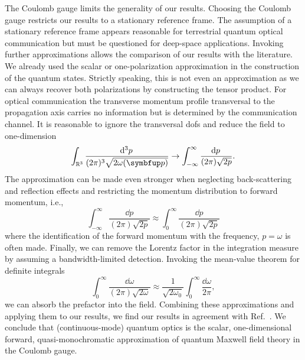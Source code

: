 The Coulomb gauge limits the generality of our results.
Choosing the Coulomb gauge restricts our results to a stationary reference frame.
The assumption of a stationary reference frame appears reasonable for terrestrial quantum optical communication but must be questioned for deep-space applications.
Invoking further approximations allows the comparison of our results with the literature.
We already used the scalar or one-polarization approximation in the construction of the quantum states.
Strictly speaking, this is not even an approximation as we can always recover both polarizations by constructing the tensor product.
For optical communication the transverse momentum profile transversal to the propagation axis carries no information but is determined by the communication channel.
It is reasonable to ignore the transversal \gls{dof}s and reduce the field to one-dimension~ \cite[p.~53]{Cohen2019}
\begin{equation}
	\int_{\mathbb{R}^3}
	\frac{\dd[3]{p}}{(2\pi)^3\sqrt{2\omega(\vb{p})}}
	\to
	\int_{-\infty}^{\infty}
	\frac{\dd{p}}{(2\pi)\sqrt{2p}}
	.
\end{equation}
The approximation can be made even stronger when neglecting back-scattering and reflection effects and restricting the momentum distribution to forward momentum, i.e.,
\begin{equation}
	\int_{-\infty}^{\infty}
	\frac{\dd{p}}{(2\pi)\sqrt{2p}}
	\approx	
	\int_{0}^{\infty}
	\frac{\dd{p}}{(2\pi)\sqrt{2p}}	
\end{equation}
where the identification of the forward momentum with the frequency, $p=\omega$ is often made.
Finally, we can remove the Lorentz factor in the integration measure by assuming a bandwidth-limited detection.
Invoking the mean-value theorem for definite integrals
\begin{equation}
	\int_{0}^{\infty}
	\frac{\dd{\omega}}{(2\pi)\sqrt{2\omega}}
	\approx
	\frac{1}{\sqrt{2\omega_0}}
	\int_{0}^{\infty}
	\frac{\dd{\omega}}{2\pi}
	,
\end{equation}
we can absorb the prefactor into the field.
Combining these approximations and applying them to our results, we find our results in agreement with Ref.~\cite{Barnett2002}.
We conclude that (continuous-mode) quantum optics is the scalar, one-dimensional forward, quasi-monochromatic approximation of quantum Maxwell field theory in the Coulomb gauge.
